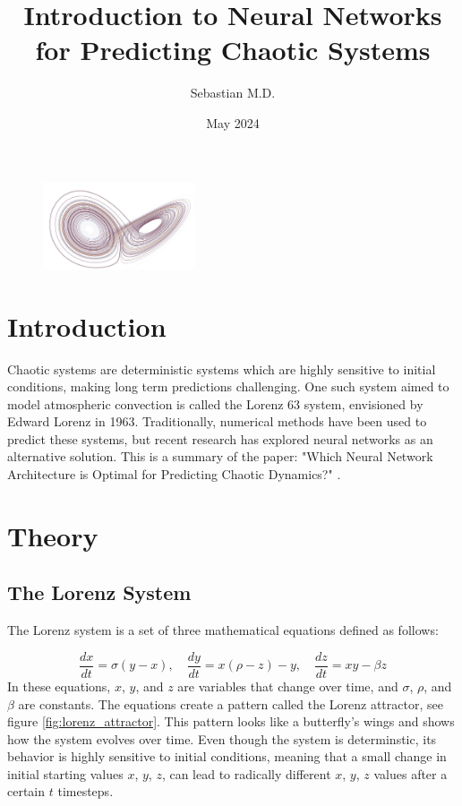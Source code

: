 \documentclass[11pt]{article}
\title{Introduction to Neural Networks for Predicting Chaotic Systems}
\author{Sebastian M.D.}
\date{May 2024}
\begin{document}
\maketitle

\begin{figure}[h]
\centering
\includegraphics[width=0.4\textwidth]{title_page_image.jpeg}
\end{figure}

\section{Introduction}

Chaotic systems are deterministic systems which are highly sensitive to initial conditions, making long term predictions challenging. One such system aimed to model atmospheric convection is called the Lorenz 63 system, envisioned by Edward Lorenz in 1963. Traditionally, numerical methods have been used to predict these systems, but recent research has explored neural networks as an alternative solution. This is a summary of the paper: "Which Neural Network Architecture is Optimal for Predicting Chaotic Dynamics?" \cite{neural-network-comparison}. 

\section{Theory}

\subsection{The Lorenz System}
The Lorenz system is a set of three mathematical equations defined as follows:

\[
\frac{dx}{dt} = \sigma(y - x), \quad \frac{dy}{dt} = x(\rho - z) - y, \quad \frac{dz}{dt} = xy - \beta z
\]
In these equations, $x$, $y$, and $z$ are variables that change over time, and $\sigma$, $\rho$, and $\beta$ are constants. The equations create a pattern called the Lorenz attractor, see figure \ref{fig:lorenz_attractor}. This pattern looks like a butterfly's wings and shows how the system evolves over time. Even though the system is determinstic, its behavior is highly sensitive to initial conditions, meaning that a small change in initial starting values $x$, $y$, $z$, can lead to radically different $x$, $y$, $z$ values after a certain $t$ timesteps. 
\end{document}
